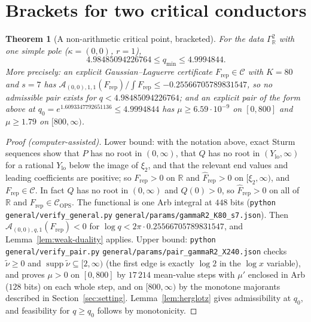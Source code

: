 \documentclass[11pt]{amsart}
\newcommand{\RR}{\mathbb R}
\newcommand{\supp}{\operatorname{supp}}
\newcommand{\FT}[1]{\widehat{#1}}
\newcommand{\xin}[1]{\xi_{#1}}
\newcommand{\GR}{\Gamma_{\mathbb R}}
\newcommand{\Arch}{\mathcal A}
\newcommand{\Cone}{\mathcal C}
\newcommand{\ConeOPS}{\mathcal C_{\mathrm{OPS}}}
\newcommand{\qmin}{q_{\min}}
\newcommand{\Frep}{F_{\mathrm{rep}}}
\newtheorem{theorem}{Theorem}[section]
\theoremstyle{definition}
\theoremstyle{remark}
\numberwithin{equation}{section}
\begin{document}
\section{Brackets for two critical conductors}\label{sec:brackets}

\begin{theorem}[A non-arithmetic critical point, bracketed]\label{thm:GR2}
For the data $\GR^2$ with one simple pole \textup{(}$\kappa=(0,0)$, $r=1$\textup{)},
\[
4.98485094226764\le\qmin\le4.9994844 .
\]
More precisely: an explicit Gaussian--Laguerre certificate $\Frep\in\Cone$ with $K=80$ and $s=7$ has
$\Arch_{(0,0),1,1}(\Frep)/\int\Frep\le-0.25566705789831547$, so no admissible pair exists for $q<4.98485094226764$; and an explicit
pair of the form above at $q_0=e^{1.6093347792651136}\le4.9994844$ has $\mu\ge6.59\cdot10^{-9}$ on $[0,800]$ and $\mu\ge1.79$ on
$[800,\infty)$.
\end{theorem}

\begin{proof}[Proof \textup{(computer-assisted)}]
Lower bound: with the notation above, exact Sturm sequences show that $P$ has no root in $(0,\infty)$, that $Q$ has no root
in $(Y_{\mathrm{lo}},\infty)$ for a rational $Y_{\mathrm{lo}}$ below the image of $\xin2$, and that the relevant end values and leading
coefficients are positive; so $\Frep>0$ on $\RR$ and $\FT F_{\mathrm{rep}}>0$ on $[\xin2,\infty)$, and $\Frep\in\Cone$. In fact $Q$ has no
root in $(0,\infty)$ and $Q(0)>0$, so $\FT F_{\mathrm{rep}}>0$ on all of $\RR$ and $\Frep\in\ConeOPS$. The functional is one
Arb integral at $448$ bits (\texttt{python} \nolinkurl{general/verify_general.py} \nolinkurl{general/params/gammaR2_K80_s7.json}). Then
$\Arch_{(0,0),q,1}(\Frep)<0$ for $\log q<2\pi\cdot0.25566705789831547$, and Lemma~\ref{lem:weak-duality} applies. Upper bound:
\texttt{python} \nolinkurl{general/verify_pair.py} \nolinkurl{general/params/pair_gammaR2_X240.json} checks $\tilde\nu\ge0$ and
$\supp\tilde\nu\subseteq[2,\infty)$ (the first edge is exactly $\log2$ in the $\log x$ variable), and proves $\mu>0$ on $[0,800]$ by
$17\,214$ mean-value steps with $\mu'$ enclosed in Arb ($128$ bits) on each whole step, and on $[800,\infty)$ by the monotone
majorants described in Section~\ref{sec:setting}. Lemma~\ref{lem:herglotz} gives admissibility at $q_0$, and feasibility for $q\ge q_0$
follows by monotonicity.
\end{proof}
\end{document}
